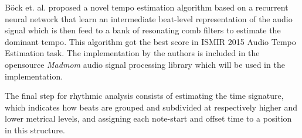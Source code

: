 B\"{o}ck et. al. proposed a novel tempo estimation algorithm based on a recurrent neural network that learn an intermediate
beat-level representation of the audio signal which is then feed to a bank of resonating comb filters to estimate
the dominant tempo\cite{madmom}. This algorithm got the best score in ISMIR 2015 Audio Tempo Estimation task.
The implementation by the authors is included in the opensource \textit{Madmom} audio signal processing library which
will be used in the implementation.

The final step for rhythmic analysis consists of estimating the time signature, which indicates how beats are grouped
and subdivided at respectively higher and lower metrical levels, and assigning each note-start and offset time to
a position in this structure\cite{cemgil2011monte}.


